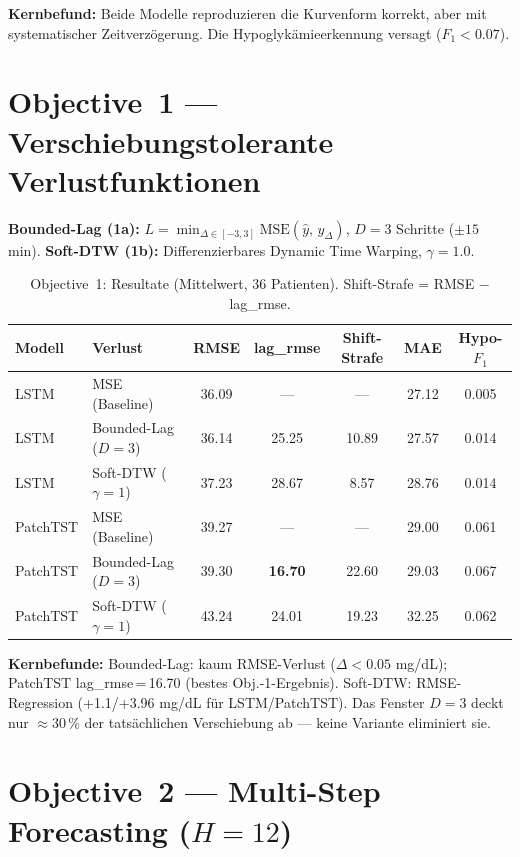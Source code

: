 \documentclass[a4paper,10pt]{article}
\begin{document}
\textbf{Kernbefund:} Beide Modelle reproduzieren die Kurvenform korrekt, aber mit systematischer Zeitverzögerung. Die Hypoglykämieerkennung versagt ($F_1 < 0.07$).

\section{Objective~1 --- Verschiebungstolerante Verlustfunktionen}

\textbf{Bounded-Lag (1a):} $L = \min_{\Delta \in [-3,3]} \mathrm{MSE}(\hat{y},\, y_\Delta)$, $D{=}3$ Schritte (${\pm}15$\,min). \quad
\textbf{Soft-DTW (1b):} Differenzierbares Dynamic Time Warping, $\gamma{=}1.0$.

\begin{table}[h!]
\centering
\caption{Objective~1: Resultate (Mittelwert, 36 Patienten). Shift-Strafe = RMSE $-$ lag\_rmse.}
\small
\begin{tabular}{llccccc}
\toprule
Modell & Verlust & RMSE & lag\_rmse & Shift-Strafe & MAE & Hypo-$F_1$ \\
\midrule
LSTM     & MSE (Baseline)        & 36.09 & ---   & ---   & 27.12 & 0.005 \\
LSTM     & Bounded-Lag ($D{=}3$) & 36.14 & 25.25 & 10.89 & 27.57 & 0.014 \\
LSTM     & Soft-DTW ($\gamma{=}1$) & 37.23 & 28.67 & 8.57  & 28.76 & 0.014 \\
\midrule
PatchTST & MSE (Baseline)        & 39.27 & ---   & ---   & 29.00 & 0.061 \\
PatchTST & Bounded-Lag ($D{=}3$) & 39.30 & \textbf{16.70} & 22.60 & 29.03 & 0.067 \\
PatchTST & Soft-DTW ($\gamma{=}1$) & 43.24 & 24.01 & 19.23 & 32.25 & 0.062 \\
\bottomrule
\end{tabular}
\end{table}

\textbf{Kernbefunde:} Bounded-Lag: kaum RMSE-Verlust ($\Delta{<}0.05$ mg/dL); PatchTST lag\_rmse\,=\,16.70 (bestes Obj.-1-Ergebnis). Soft-DTW: RMSE-Regression (+1.1/+3.96 mg/dL für LSTM/PatchTST). Das Fenster $D{=}3$ deckt nur $\approx$30\,\% der tatsächlichen Verschiebung ab --- keine Variante eliminiert sie.

\section{Objective~2 --- Multi-Step Forecasting ($H{=}12$)}
\end{document}
